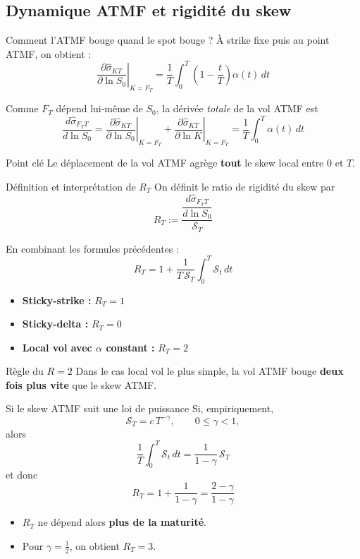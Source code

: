 \subsection{Dynamique ATMF et rigidité du skew}

\begin{frame}{Comment l'ATMF bouge quand le spot bouge ?}
\small
À strike fixe puis au point ATMF, on obtient :
\[
\left.
\frac{\partial \hat{\sigma}_{KT}}{\partial \ln S_0}
\right|_{K=F_T}
=
\frac{1}{T}\int_0^T\left(1-\frac{t}{T}\right)\alpha(t)\,dt
\]

Comme \(F_T\) dépend lui-même de \(S_0\), la dérivée \emph{totale} de la vol ATMF est
\[
\frac{d\hat{\sigma}_{F_TT}}{d\ln S_0}
=
\left.
\frac{\partial \hat{\sigma}_{KT}}{\partial \ln S_0}
\right|_{K=F_T}

+
\left.
\frac{\partial \hat{\sigma}_{KT}}{\partial \ln K}
\right|_{K=F_T}
=
\frac{1}{T}\int_0^T \alpha(t)\,dt
\]

\begin{block}{Point clé}
Le déplacement de la vol ATMF agrège \textbf{tout} le skew local entre \(0\) et \(T\).
\end{block}
\end{frame}

\begin{frame}{Définition et interprétation de \(R_T\)}
\small
On définit le ratio de rigidité du skew par
\[
R_T
:=
\frac{\dfrac{d\hat{\sigma}_{F_TT}}{d\ln S_0}}{\mathcal{S}_T}
\]

En combinant les formules précédentes :
\[
R_T
=
1+\frac{1}{T\,\mathcal{S}_T}\int_0^T \mathcal{S}_t\,dt
\]

\begin{itemize}
    \item \textbf{Sticky-strike :} \(R_T=1\)
    \item \textbf{Sticky-delta :} \(R_T=0\)
    \item \textbf{Local vol avec \(\alpha\) constant :} \(R_T=2\)
\end{itemize}

\begin{alertblock}{Règle du \(R=2\)}
Dans le cas local vol le plus simple, la vol ATMF bouge \textbf{deux fois plus vite} que le skew ATMF.
\end{alertblock}
\end{frame}

\begin{frame}{Si le skew ATMF suit une loi de puissance}
\small
Si, empiriquement,
\[
\mathcal{S}_T = c\,T^{-\gamma},
\qquad 0\le \gamma <1,
\]
alors
\[
\frac{1}{T}\int_0^T \mathcal{S}_t\,dt
=
\frac{1}{1-\gamma}\,\mathcal{S}_T
\]
et donc
\[
R_T
=
1+\frac{1}{1-\gamma}
=
\frac{2-\gamma}{1-\gamma}
\]

\begin{itemize}
    \item \(R_T\) ne dépend alors \textbf{plus de la maturité}.
    \item Pour \(\gamma=\tfrac12\), on obtient \(R_T=3\).
\end{itemize}
\end{frame}

